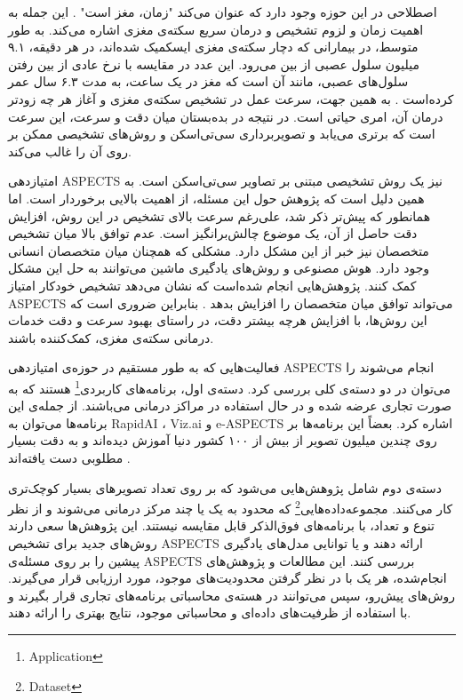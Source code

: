 اصطلاحی در این حوزه وجود دارد که عنوان می‌کند "زمان، مغز است" \cite{saver2006time}.
این جمله به اهمیت زمان و لزوم تشخیص و درمان سریع سکته‌ی مغزی اشاره می‌کند.
به طور متوسط، در بیمارانی که دچار سکته‌ی مغزی ایسکمیک شده‌اند، در هر دقیقه، ۹.۱ میلیون سلول عصبی از بین می‌رود.
این عدد در مقایسه با نرخ عادی از بین رفتن سلول‌های عصبی، مانند آن است که مغز در یک ساعت، به مدت ۶.۳ سال عمر کرده‌است \cite{saver2006time}.
به همین جهت، سرعت عمل در تشخیص سکته‌ی مغزی و آغاز هر چه زودتر درمان آن، امری حیاتی است.
در نتیجه در بده‌بستان میان دقت و سرعت، این سرعت است که برتری می‌یابد و تصویربرداری سی‌تی‌اسکن و روش‌های تشخیصی ممکن بر روی آن را غالب می‌کند.

امتیازدهی ASPECTS نیز یک روش تشخیصی مبتنی بر تصاویر سی‌تی‌اسکن است.
به همین دلیل است که پژوهش حول این مسئله، از اهمیت بالایی برخوردار است.
اما همانطور که پیش‌تر ذکر شد، علی‌رغم سرعت بالای تشخیص در این روش، افزایش دقت حاصل از آن، یک موضوع چالش‌برانگیز است.
عدم توافق بالا میان تشخیص متخصصان نیز خبر از این مشکل دارد.
مشکلی که همچنان میان متخصصان انسانی وجود دارد.
هوش مصنوعی و روش‌های یادگیری ماشین می‌توانند به حل این مشکل کمک کنند.
پژوهش‌هایی انجام شده‌است
که نشان می‌دهد تشخیص خودکار امتیاز ASPECTS می‌تواند توافق میان متخصصان را افزایش بدهد \cite{chen2022improving}.
بنابراین ضروری است که این روش‌ها، با افزایش هرچه بیشتر دقت، در راستای بهبود سرعت و دقت خدمات درمانی سکته‌ی مغزی، کمک‌کننده باشند.


فعالیت‌هایی که به طور مستقیم در حوزه‌ی امتیازدهی ASPECTS انجام می‌شوند را می‌توان در دو دسته‌ی کلی بررسی کرد.
دسته‌ی اول، 
برنامه‌های کاربردی\footnote{Application} هستند 
که به صورت تجاری عرضه شده و در حال استفاده در مراکز درمانی می‌باشند.
از جمله‌ی این برنامه‌ها می‌توان به RapidAI \cite{rapidai}،
 Viz.ai \cite{vizai} و e-ASPECTS \cite{brainomix} اشاره کرد.
بعضاً این برنامه‌ها بر روی چندین میلیون تصویر از بیش از ۱۰۰ کشور دنیا آموزش دیده‌اند
و به دقت بسیار مطلوبی دست یافته‌اند \cite{rapidai}.

دسته‌ی دوم شامل پژوهش‌هایی می‌شود که بر روی
تعداد تصویرهای بسیار کوچک‌تری کار می‌کنند.
مجموعه‌داده‌هایی\footnote{Dataset}
 که محدود به یک یا چند مرکز درمانی می‌شوند و از نظر تنوع و تعداد،‌ با برنامه‌های فوق‌الذکر قابل مقایسه نیستند.
این پژوهش‌ها سعی دارند روش‌های جدید برای تشخیص ASPECTS ارائه دهند و یا توانایی مدل‌های یادگیری پیشین را بر روی مسئله‌ی ASPECTS بررسی کنند.
 این مطالعات و پژوهش‌های انجام‌شده، هر یک با در نظر 
 گرفتن محدودیت‌های  موجود، مورد ارزیابی قرار 
 می‌گیرند.
روش‌های پیش‌رو، سپس می‌توانند در هسته‌ی محاسباتی برنامه‌های تجاری قرار بگیرند 
و با استفاده از ظرفیت‌های داده‌ای و محاسباتی موجود، نتایج بهتری را ارائه دهند.

